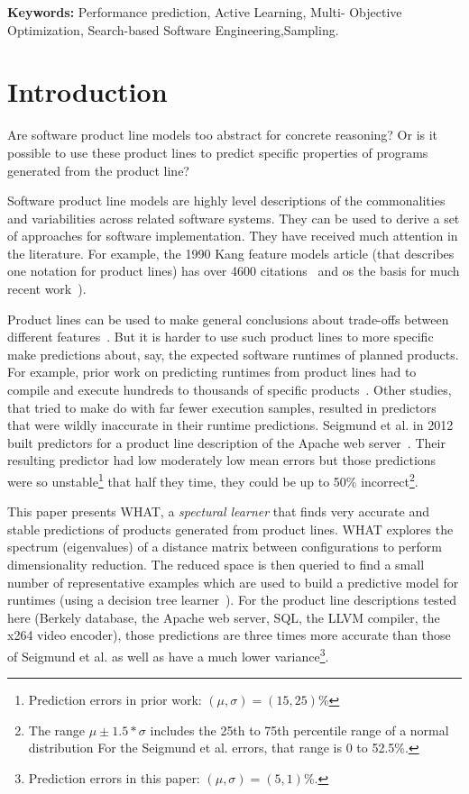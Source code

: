\documentclass{sig-alternative}
\begin{document}
{\bf Keywords:} Performance prediction, Active Learning, 
Multi- Objective Optimization,
Search-based Software Engineering,Sampling.
 

 
\section{Introduction}
 
 Are software  product line models too abstract for concrete reasoning?
Or is it possible to use these product lines to predict specific properties 
of programs generated from the product line? 

Software product line models are highly level descriptions of the commonalities and variabilities   across related software systems. They can be used to derive a set of approaches for software implementation. 
They have received much attention in the literature.
For example, the 1990 Kang feature models article (that describes one notation for product lines) has over 4600 citations~\cite{kang1990feature} and os the basis for 
much recent work~\cite{lopez15,harman14,sayyad13a,sayyad13b}).

 Product lines can be used to make general conclusions about trade-offs between different features~\cite{sayyad13a,sayyad13b}. 
But it is harder to use
such product lines to more specific make
predictions about, say, the expected software runtimes of planned products. 
For example, prior work on predicting runtimes from product lines had  to compile and execute
hundreds to thousands of specific products~\cite{guo2013variability}. 
Other studies, that tried to make do with   far fewer execution samples, resulted
in predictors that were
 wildly inaccurate in their runtime predictions.
Seigmund et al. in 2012 built predictors for a product line description of the Apache web server~\cite{siegmund2012predicting}. Their resulting predictor had low moderately low mean errors   but those predictions
 were  so  unstable\footnote{Prediction errors in prior  work: $(\mu,\sigma)=(15,25)$\%} that half they time, they could be up to 50\% incorrect\footnote{
 The range  $\mu \pm 1.5*\sigma$  includes the
 25th to 75th percentile range of a normal distribution   
For the Seigmund et al. errors, that range is  0 to 52.5\%.}.
 

This paper presents WHAT, a {\em spectural learner}     that finds very
accurate and  stable predictions of products generated from  product lines.
WHAT explores the spectrum (eigenvalues) of a distance matrix
between  configurations to perform dimensionality reduction. The reduced
space is then queried to find a small number of representative examples which are used to
build a predictive model for runtimes (using a decision tree learner~\cite{breiman1984}).
For the product line descriptions tested here (Berkely database, the Apache web server, SQL, the LLVM compiler, the x264 video encoder),
those predictions are three times more accurate than those of Seigmund et al. as well
as have a much lower variance\footnote{Prediction errors in this paper: $(\mu,\sigma) = (5,1)$\%.}.
\end{document}
